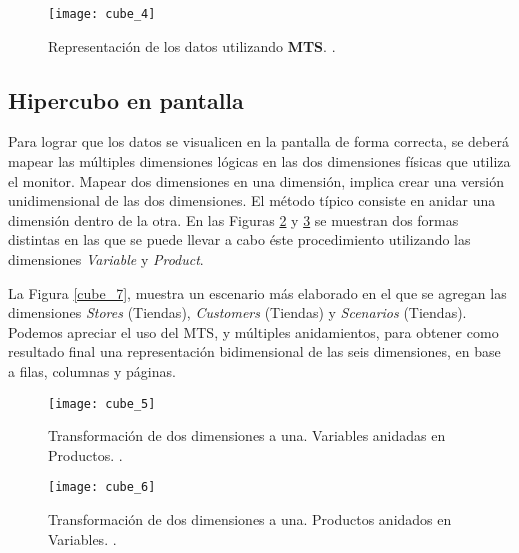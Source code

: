 \documentclass[a4paper,11pt]{article}
\begin{document}
    \begin{figure}
      \begin{center}
        \texttt{[image: cube\_4]}
        \caption{Representación de los datos utilizando \textbf{MTS}. \cite[p.~55]{olap_solutions}.}
        \label{cube_4}
      \end{center}
    \end{figure}
    
    
    \subsection{Hipercubo en pantalla}
    
    Para lograr que los datos se visualicen en la pantalla de forma correcta, se deberá mapear las múltiples dimensiones lógicas en las dos dimensiones físicas
    que utiliza el monitor.
    Mapear dos dimensiones en una dimensión, implica crear una versión unidimensional de las dos dimensiones.
    El método típico consiste en anidar una dimensión dentro de la otra. En las Figuras \ref{cube_5} y \ref{cube_6} se muestran dos formas distintas en las que
    se puede llevar a cabo éste procedimiento utilizando las dimensiones \textit{Variable} y \textit{Product}.
    
    La Figura \ref{cube_7}, muestra un escenario más elaborado en el que se agregan las dimensiones \textit{Stores} (Tiendas), \textit{Customers} (Tiendas)
    y \textit{Scenarios} (Tiendas). Podemos apreciar el uso del MTS, y múltiples anidamientos, para obtener como resultado final una representación
    bidimensional de las seis dimensiones, en base a filas, columnas y páginas.
    
    \begin{figure}
      \begin{center}
        \texttt{[image: cube\_5]}
        \caption{Transformación de dos dimensiones a una. Variables anidadas en Productos. \cite[p.~58]{olap_solutions}.}
        \label{cube_5}
      \end{center}
    \end{figure}
    
    \begin{figure}
      \begin{center}
        \texttt{[image: cube\_6]}
        \caption{Transformación de dos dimensiones a una. Productos anidados en Variables. \cite[p.~58]{olap_solutions}.}
        \label{cube_6}
      \end{center}
    \end{figure}
    
\end{document}
